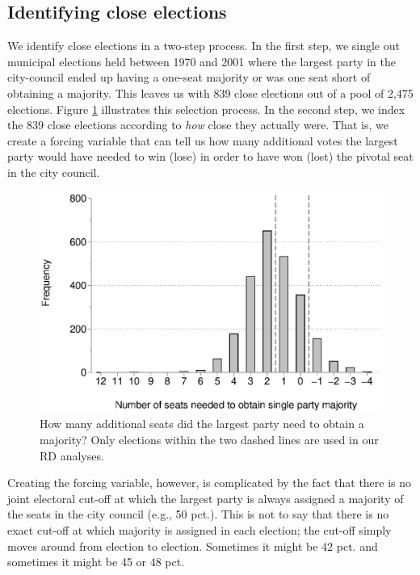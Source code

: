 \documentclass[a4paper,12pt]{article}
\begin{document}
\subsection{Identifying close elections}
We identify close elections in a two-step process. In the first step, we single out municipal elections held between 1970 and 2001 where the largest party in the city-council ended up having a one-seat majority or was one seat short of obtaining a majority. This leaves us with 839 close elections out of a pool of 2,475 elections. Figure \ref{figure:closeelec} illustrates this selection process. In the second step, we index the 839 close elections according to \emph{how} close they actually were. That is, we create a forcing variable that can tell us how many additional votes the largest party would have needed to win (lose) in order to have won (lost) the pivotal seat in the city council.


\begin{figure}[htbp] 
	\centering
	\includegraphics[width=1\textwidth]{closeelec.eps}
	\caption{How many additional seats did the largest party need to obtain a majority? Only elections within the two dashed lines are used in our RD analyses.}
	\label{figure:closeelec}
\end{figure}

Creating the forcing variable, however, is complicated by the fact that there is no joint electoral cut-off at which the largest party is always assigned a majority of the seats in the city council (e.g., 50 pct.). This is not to say that there is no exact cut-off at which majority is assigned in each election; the cut-off simply moves around from election to election. Sometimes it might be 42 pct. and sometimes it might be 45 or 48 pct. 
\end{document}
